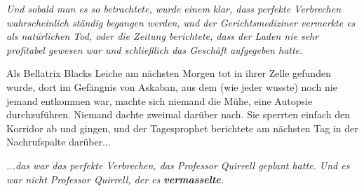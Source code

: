 \emph{Und sobald man es so betrachtete, wurde einem klar, dass perfekte
Verbrechen wahrscheinlich ständig begangen werden, und der Gerichtsmediziner
vermerkte es als natürlichen Tod, oder die Zeitung berichtete, dass der Laden
nie sehr profitabel gewesen war und schließlich das Geschäft aufgegeben hatte.}

Als Bellatrix Blacks Leiche am nächsten Morgen tot in ihrer Zelle gefunden
wurde, dort im Gefängnis von Askaban, aus dem (wie jeder wusste) noch nie jemand
entkommen war, machte sich niemand die Mühe, eine Autopsie durchzuführen.
Niemand dachte zweimal darüber nach. Sie sperrten einfach den Korridor ab und
gingen, und der Tagesprophet berichtete am nächsten Tag in der Nachrufspalte
darüber...

\emph{...das war das perfekte Verbrechen, das Professor Quirrell geplant hatte.
Und es war nicht Professor Quirrell, der es \textbf{vermasselte}.}

